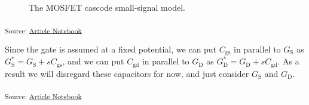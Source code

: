 \documentclass[
  a4paper,
  DIV=11,
  numbers=noendperiod]{scrartcl}
\begin{document}
\begin{figure}[H]


\caption{\label{fig-cascode-small-signal}The MOSFET cascode small-signal
model.}

\end{figure}%

\textsubscript{Source:
\href{https://iic-jku.github.io/analog-circuit-design/index.qmd.html}{Article
Notebook}}

Since the gate is assumed at a fixed potential, we can put
\(C_\mathrm{gs}\) in parallel to \(G_\mathrm{S}\) as
\(G_\mathrm{S}^{*} = G_\mathrm{S} + s C_\mathrm{gs}\), and we can put
\(C_\mathrm{gd}\) in parallel to \(G_\mathrm{D}\) as
\(G_\mathrm{D}^{*} = G_\mathrm{D} + s C_\mathrm{gd}\). As a result we
will disregard these capacitors for now, and just consider
\(G_\mathrm{S}\) and \(G_\mathrm{D}\).

\textsubscript{Source:
\href{https://iic-jku.github.io/analog-circuit-design/index.qmd.html}{Article
Notebook}}
\end{document}
